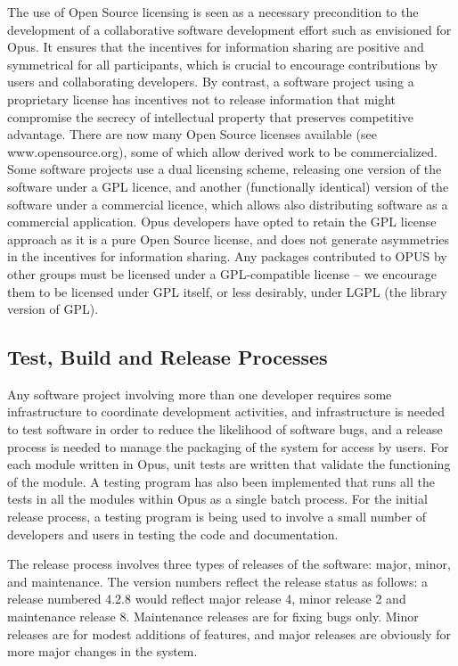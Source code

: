 The use of Open Source licensing is seen as a necessary precondition to the development of a collaborative software development effort such as envisioned for Opus.  It ensures that the incentives for information sharing are positive and symmetrical for all participants, which is crucial to encourage contributions by users and collaborating developers.  By contrast, a software project using a proprietary license has incentives not to release information that might compromise the secrecy of intellectual property that preserves competitive advantage. 
There are now many Open Source licenses available (see www.opensource.org), some of which allow derived work to be commercialized.  Some software projects use a dual licensing scheme, releasing one version of the software under a GPL licence, and another (functionally identical) version of the software under a commercial licence, which allows also distributing software as a commercial application.  Opus developers have opted to retain the GPL license approach as it is a pure Open Source license, and does not generate asymmetries in the incentives for information sharing. Any packages contributed to OPUS by other groups must be licensed under a GPL-compatible license – we encourage them to be licensed under GPL itself, or less desirably, under LGPL (the library version of GPL).

\subsection{Test, Build and Release Processes}
Any software project involving more than one developer requires some infrastructure to coordinate development activities, and infrastructure is needed to test software in order to reduce the likelihood of software bugs, and a release process is needed to manage the packaging of the system for access by users.  For each module written in Opus, unit tests are written that validate the functioning of the module. A testing program has also been implemented that runs all the tests in all the modules within Opus as a single batch process.  
For the initial release process, a testing program is being used to involve a small number of developers and users in testing the code and documentation.  

The release process involves three types of releases of the software: major, minor, and maintenance. The version numbers reflect the release status as follows: a release numbered 4.2.8 would reflect major release 4, minor release 2 and maintenance release 8.  Maintenance releases are for fixing bugs only.  Minor releases are for modest additions of features, and major releases are obviously for more major changes in the system.

